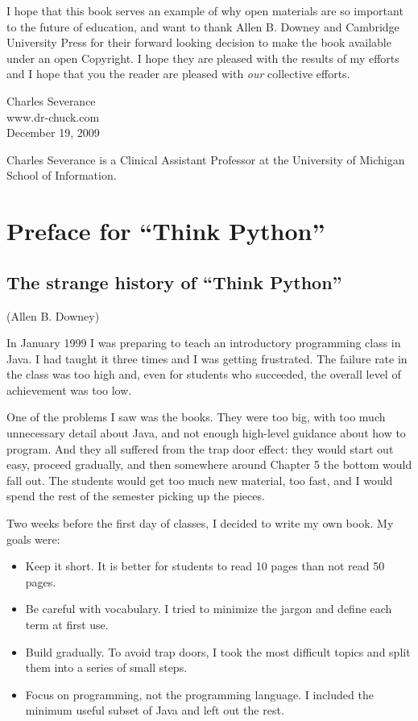 \documentclass[10pt]{book}
\begin{document}
I hope that this book serves an example of why open 
materials are so important to the future of education,
and want to thank Allen B. Downey and Cambridge University
Press for their forward looking decision to make the book available
under an open Copyright.   I hope they are pleased with the 
results of my efforts and I hope that you the reader are pleased with
{\em our} collective efforts.

Charles Severance\\
www.dr-chuck.com\\
December 19, 2009

Charles Severance is a 
Clinical Assistant Professor 
at the University of Michigan School of Information.

\section*{Preface for ``Think Python''}

\subsection*{The strange history of ``Think Python''}

(Allen B. Downey)

In January 1999 I was preparing to teach an introductory programming
class in Java.  I had taught it three times and I was getting
frustrated.  The failure rate in the class was too high and, even for
students who succeeded, the overall level of achievement was too low.

One of the problems I saw was the books.  
They were too big, with too much unnecessary detail about Java, and
not enough high-level guidance about how to program.  And they all
suffered from the trap door effect: they would start out easy,
proceed gradually, and then somewhere around Chapter 5 the bottom would
fall out.  The students would get too much new material, too fast,
and I would spend the rest of the semester picking up the pieces.

Two weeks before the first day of classes, I decided to write my
own book.  
My goals were:

\begin{itemize}

\item Keep it short.  It is better for students to read 10 pages
than not read 50 pages.

\item Be careful with vocabulary.  I tried to minimize the jargon
and define each term at first use.

\item Build gradually. To avoid trap doors, I took the most difficult
topics and split them into a series of small steps. 

\item Focus on programming, not the programming language.  I included
the minimum useful subset of Java and left out the rest.

\end{itemize}
\end{document}
